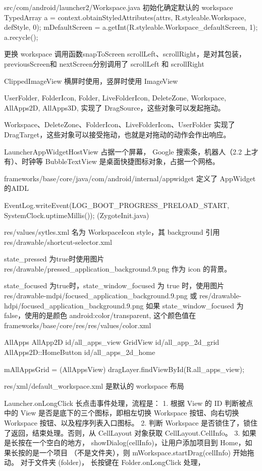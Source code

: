 \documentclass{book}
\begin{document}
\begin{CJK}{UTF8}{gbsn}
src/com/android/launcher2/Workspace.java
初始化确定默认的 workspace
  TypedArray a = context.obtainStyledAttributes(attrs, R.styleable.Workspace, defStyle, 0);
        mDefaultScreen = a.getInt(R.styleable.Workspace_defaultScreen, 1);
        a.recycle();

更换 workspace 调用函数snapToScreen
scrollLeft、scrollRight，是对其包装，previousScreen和
nextScreen分别调用了 scrollLeft 和 scrollRight

ClippedImageView 横屏时使用，竖屏时使用 ImageView

UserFolder, FolderIcon, Folder, LiveFolderIcon, DeleteZone, Workspace, AllApps2D, AllApps3D,
实现了 DragSource，这些对象可以发起拖动。

Workspace、DeleteZone、FolderIcon、LiveFolderIcon、UserFolder
实现了 DragTarget，这些对象可以接受拖动，也就是对拖动的动作会作出响应。

LauncherAppWidgetHostView 占据一个屏幕， Google 搜索条，机器人（2.2
上才有）、时钟等
BubbleTextView 是桌面快捷图标对象，占据一个网格。

frameworks/base/core/java/com/android/internal/appwidget   定义了 AppWidget
的AIDL

 EventLog.writeEvent(LOG_BOOT_PROGRESS_PRELOAD_START,
                SystemClock.uptimeMillis());
(ZygoteInit.java)

res/values/sytles.xml 名为 WorkspaceIcon style，其 background 引用
res/drawable/shortcut-selector.xml

state_pressed 为true时使用图片 res/drawable/pressed_application_background.9.png
作为 icon 的背景。

state_focused 为true时，state_window_focused 为 true
时，使用图片 res/drawable-mdpi/focused_application_background.9.png 或
             res/drawable-hdpi/focused_application_background.9.png 
如果 state_window_focused 为 false，使用的是颜色 android:color/transparent,
这个颜色值在 frameworks/base/core/res/res/values/color.xml

AllApps
AllApp2D   id/all_apps_view
  GridView  id/all_app_2d_grid
  AllApps2D::HomeButton id/all_apps_2d_home

  mAllAppsGrid = (AllAppsView) dragLayer.findViewById(R.all_apps_view);

  res/xml/default_workspace.xml  是默认的 workspace 布局

Launcher.onLongClick
长点击事件处理，流程是：
1. 根据 View 的 ID 判断被点中的 View
是否是底下的三个图标，即相左切换 Workspace 按钮、向右切换 Workspace
按钮、以及程序列表入口图标。
2. 判断 Workspace 是否锁住了，锁住了返回，结束处理。否则，从 CellLayout
对象获取 CellLayout.CellInfo。
3. 如果是长按在一个空白的地方， showDialog(cellInfo)，让用户添加项目到
  Home，如果长按的是一个项目 （不是文件夹），则
  mWorkspace.startDrag(cellInfo) 开始拖动。 对于文件夹 (folder)， 长按键在
  Folder.onLongClick 处理，



\end{CJK}
\end{document}
